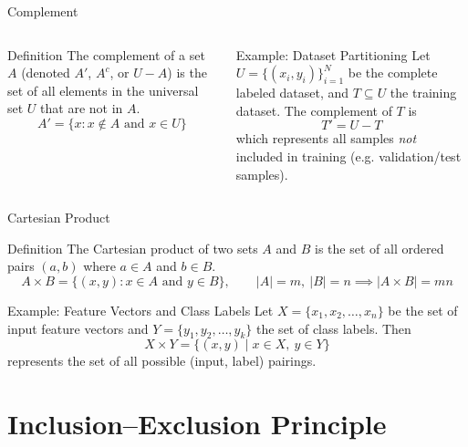 \documentclass[aspectratio=169]{beamer}
\begin{document}
\begin{frame}{Complement}
\small
\begin{columns}
\begin{block}{Definition}
The complement of a set $A$ (denoted $A'$, $A^c$, or $U-A$) is the set of all elements in the universal set $U$ that are not in $A$.
$$A'=\{x : x\notin A \text{ and } x\in U\}$$
\end{block}
\begin{exampleblock}{Example: Dataset Partitioning}
Let $U=\{(x_i,y_i)\}_{i=1}^{N}$ be the complete labeled dataset, and $T\subseteq U$ the training dataset. The complement of $T$ is
$$T'=U-T$$
which represents all samples \emph{not} included in training (e.g. validation/test samples).
\end{exampleblock}
\centering
{}
\end{columns}
\end{frame}

\begin{frame}{Cartesian Product}
\begin{block}{Definition}
The Cartesian product of two sets $A$ and $B$ is the set of all ordered pairs $(a,b)$ where $a\in A$ and $b\in B$.
$$A\times B=\{(x,y) : x\in A \text{ and } y\in B\}, \qquad |A|=m,\ |B|=n \implies |A\times B|=mn$$
\end{block}
\begin{exampleblock}{Example: Feature Vectors and Class Labels}
Let $X=\{x_1,x_2,\dots,x_n\}$ be the set of input feature vectors and $Y=\{y_1,y_2,\dots,y_k\}$ the set of class labels. Then
$$X\times Y=\{(x,y) \mid x\in X,\ y\in Y\}$$
represents the set of all possible (input, label) pairings.
\end{exampleblock}
\end{frame}

\section{Inclusion--Exclusion Principle}
\end{document}
